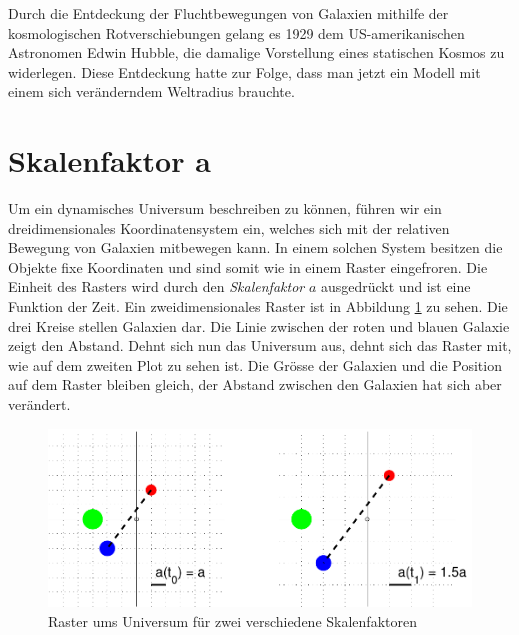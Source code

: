 \begin{refsection}
Durch die Entdeckung der Fluchtbewegungen von Galaxien mithilfe der kosmologischen Rotverschiebungen gelang es 1929 dem US-amerikanischen Astronomen Edwin Hubble, die damalige Vorstellung eines statischen Kosmos zu widerlegen. Diese Entdeckung hatte zur Folge, dass man jetzt ein Modell mit einem sich veränderndem Weltradius brauchte.
\pagebreak
\section{Skalenfaktor a}
Um ein dynamisches Universum beschreiben zu können, führen wir ein dreidimensionales Koordinatensystem ein, welches sich mit der relativen Bewegung von Galaxien mitbewegen kann. In einem solchen System besitzen die Objekte fixe Koordinaten und sind somit wie in einem Raster eingefroren. Die Einheit des Rasters wird durch den {\em Skalenfaktor} $a$ ausgedrückt und ist eine Funktion der Zeit. Ein zweidimensionales Raster ist in Abbildung \ref{friedmann:friedmannRaster} zu sehen. Die drei Kreise stellen Galaxien dar. Die Linie zwischen der roten und blauen Galaxie zeigt den Abstand. Dehnt sich nun das Universum aus, dehnt sich das Raster mit, wie auf dem zweiten Plot zu sehen ist. Die Grösse der Galaxien und die Position auf dem Raster bleiben gleich, der Abstand zwischen den Galaxien hat sich aber verändert. 

\begin{figure}[h]
	\centering
	\includegraphics[width  = \textwidth]{friedmann/images/rasterFriedmann}
	\caption{Raster ums Universum für zwei verschiedene Skalenfaktoren}
	\label{friedmann:friedmannRaster}
\end{figure}%


\end{refsection}

